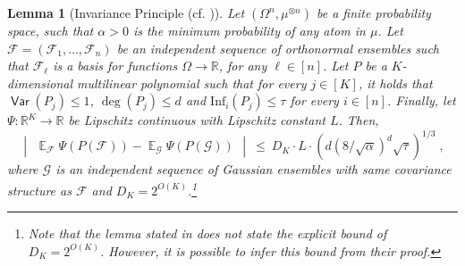 \documentclass[11pt]{article}
\newcommand{\inparen}[1]{\left ( #1 \right )}
\newcommand{\inabs}[1]{\begin{vmatrix} #1 \end{vmatrix}}
\DeclareMathOperator*{\Ex}{\mathbb{E}}
\DeclareMathOperator*{\Var}{\mathsf{Var}}
\newcommand{\bbR}{{\mathbb R}}
\newcommand{\calF}{\mathcal{F}}
\newcommand{\calG}{\mathcal{G}}
\newcommand{\calX}{\mathcal{X}}
\newcommand{\calZ}{\mathcal{Z}}
\newcommand{\Inf}{\mathrm{Inf}}
\newtheorem{lem}[theorem]{Lemma}
\begin{document}
\begin{lem}[Invariance Principle (cf. \cite{isaksson2012maximally})] \label{lem:invariance}
	Let $(\Omega^n, \mu^{\otimes n})$ be a finite probability space, such that $\alpha > 0$ is the minimum probability of any atom in $\mu$. Let $\calF = (\calF_1, \ldots, \calF_n)$ be an independent sequence of orthonormal ensembles such that $\calF_\ell$  is a basis for functions $\Omega \to \bbR$, for any $\ell \in [n]$. Let $P$ be a $K$-dimensional multilinear polynomial such that for every $j \in [K]$, it holds that $\Var(P_j) \le 1$, $\deg(P_j) \le d$ and $\Inf_i (P_j) \le \tau$ for every $i \in [n]$. Finally, let $\Psi: \bbR^K \to \bbR$ be Lipschitz continuous with Lipschitz constant $L$. Then,
	\[ \inabs{\Ex_{\calF} \Psi(P(\calF)) - \Ex_{\calG} \Psi(P(\calG))} ~\le~ D_K \cdot L \cdot \inparen{d (8/\sqrt{\alpha})^d \sqrt{\tau}}^{1/3}\;,\]
	where $\calG$ is an independent sequence of Gaussian ensembles with same covariance structure as $\calF$ and $D_K = 2^{O(K)}$.\footnote{Note that the lemma stated in \cite{isaksson2012maximally} does not state the explicit bound of $D_K = 2^{O(K)}$. However, it is possible to infer this bound from their proof.}
	
\end{lem}
\end{document}
